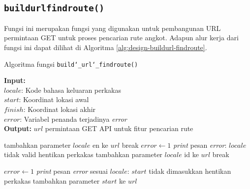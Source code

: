 \subsection{\texttt{build\textunderscore url\textunderscore findroute()}}
\label{sec:design-code-buildurl-findroute}

Fungsi ini merupakan fungsi yang digunakan untuk pembangunan URL permintaan	GET untuk proses pencarian rute angkot. Adapun alur kerja dari fungsi ini dapat dilihat di Algoritma \ref{alg:design-buildurl-findroute}.

\begin{algorithm}[h]
	\caption{\textendash\xspace Algoritma fungsi \texttt{build\char`_url\char`_findroute()}}
	\label{alg:design-buildurl-findroute}
	\vspace{-0.6\baselineskip}
	\begin{flushleft}
        \textbf{Input:} \\
        \hspace{1.1em}\textendash\xspace $locale$: Kode bahasa keluaran perkakas \\
        \hspace{1.1em}\textendash\xspace $start$: Koordinat \latlon\xspace lokasi awal \\
        \hspace{1.1em}\textendash\xspace $finish$: Koordinat \latlon\xspace lokasi akhir \\
        \hspace{1.1em}\textendash\xspace $error$: Variabel penanda terjadinya \textit{error} \\
        \textbf{Output:} $url$ permintaan GET API untuk fitur pencarian rute \\
	\end{flushleft}
	\vspace{-1.05\baselineskip}
	\begin{algorithmic}
	
			    \State tambahkan parameter $locale$ \textquotesingle\textquotesingle en\textquotesingle\textquotesingle\xspace ke $url$
				\State break
			\EndCase
			    \State $error \gets 1$
				\State \textit{print} pesan \textit{error}: $locale$ tidak valid
				\State hentikan perkakas
			\EndCase
			\Default
				\State tambahkan parameter $locale$ \textquotesingle\textquotesingle id\textquotesingle\textquotesingle\xspace ke $url$
				\State break
			\EndDefault
		\EndSwitch
		
		    \State $error \gets 1$
			\State \textit{print} pesan \textit{error} sesuai $locale$: $start$ tidak dimasukkan
			\State hentikan perkakas
		\Else
			\State tambahkan parameter $start$ ke $url$
		\EndIf
		

\end{algorithmic}
\end{algorithm}

